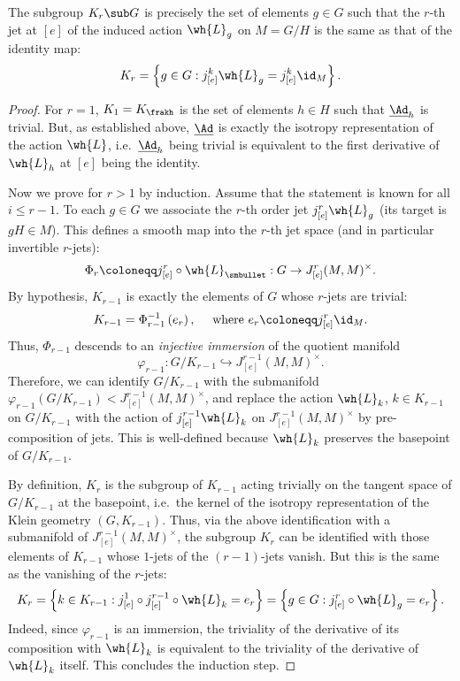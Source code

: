 \begin{lem}
    The subgroup $K_r\sub G$ is precisely the set of elements $g\in G$
    such that the $r$-th jet at $[e]$ of the induced action $\wh{L}_g$ on $M=G\slash H$ is the same as that of the identity map:
    \[K_r=\left\{g\in G: j^k_{[e]}\wh{L}_g=j^k_{[e]}\id_{M}\right\}.\]
\end{lem}
\begin{proof}
    For $r=1$, $K_1=K_{\frakh}$ is the set of elements $h\in H$ such that $\underline{\Ad}_h$ is trivial. But, as established above, $\underline{\Ad}$ is exactly the isotropy representation of the action $\wh{L}$, i.e.\ $\underline{\Ad}_h$ being trivial is equivalent to the first derivative of $\wh{L}_h$ at $[e]$ being the identity.

    Now we prove for $r>1$ by induction. Assume that the statement is known for all $i\leq r-1$. To each $g\in G$ we associate the $r$-th order jet $j^r_{[e]}\wh{L}_g$ (its target is $gH\in M$). This defines a smooth map into the $r$-th jet space (and in particular invertible $r$-jets):
    \[\Phi_r\coloneqq j_{[e]}^r\circ \wh{L}_{\smbullet}: G\to J^r_{[e]}(M,M)^\times.\]
    By hypothesis, $K_{r-1}$ is exactly the elements of $G$ whose $r$-jets are trivial:
    \[K_{r-1}=\Phi_{r-1}^{-1}\left(e_r\right), \quad \text{ where }e_r\coloneqq j^r_{[e]}\id_M.\]
    Thus, $\Phi_{r-1}$ descends to an \emph{injective immersion} of the quotient manifold
    \[\varphi_{r-1}:G\slash K_{r-1}\hookrightarrow J^{r-1}_{[e]}(M,M)^\times.\]
    Therefore, we can identify $G\slash K_{r-1}$ with the submanifold $\varphi_{r-1}(G\slash K_{r-1})< J^{r-1}_{[e]}(M,M)^\times$, and replace the action $\wh{L}_k$, $k\in K_{r-1}$ on $G\slash K_{r-1}$ with the action of $j^{r-1}_{[e]}\wh{L}_k$ on $J^{r-1}_{[e]}(M,M)^\times$ by pre-composition of jets. This is well-defined because $\wh{L}_k$ preserves the basepoint of $G\slash K_{r-1}$.
    
    By definition, $K_r$ is the subgroup of $K_{r-1}$ acting trivially on the tangent space of $G\slash K_{r-1}$ at the basepoint, i.e.\ the kernel of the isotropy representation of the Klein geometry $(G,K_{r-1})$. Thus, via the above identification with a submanifold of $J^{r-1}_{[e]}(M,M)^\times$, the subgroup $K_r$ can be identified with those elements of $K_{r-1}$ whose $1$-jets of the $(r-1)$-jets vanish. But this is the same as the vanishing of the $r$-jets: 
    \[K_r=\left\{k\in K_{r-1}: j^1_{[e]}\circ j^{r-1}_{[e]}\circ\wh{L}_k=e_r\right\}=\left\{g\in G: j^r_{[e]}\circ \wh{L}_g=e_r\right\}.\]
    Indeed, since $\varphi_{r-1}$ is an immersion, the triviality of the derivative of its composition with $\wh{L}_k$ is equivalent to the triviality of the derivative of $\wh{L}_k$ itself. This concludes the induction step.
\end{proof}



